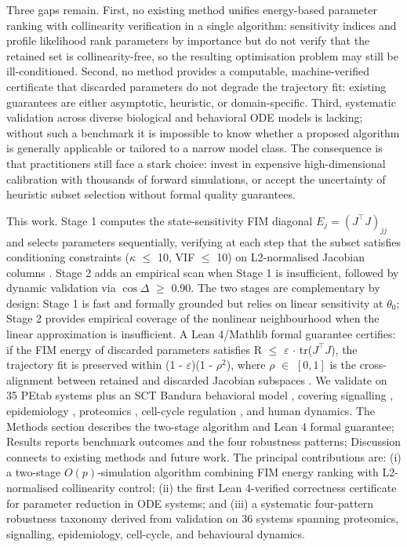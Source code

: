 \documentclass[pdflatex,sn-nature]{sn-jnl}
\begin{document}
Three gaps remain. First, no existing method unifies energy-based parameter ranking with collinearity verification in a single algorithm: sensitivity indices \cite{bib26} and profile likelihood \cite{bib24} rank parameters by importance but do not verify that the retained set is collinearity-free, so the resulting optimisation problem may still be ill-conditioned. Second, no method provides a computable, machine-verified certificate that discarded parameters do not degrade the trajectory fit: existing guarantees are either asymptotic, heuristic, or domain-specific. Third, systematic validation across diverse biological and behavioral ODE models is lacking; without such a benchmark it is impossible to know whether a proposed algorithm is generally applicable or tailored to a narrow model class. The consequence is that practitioners still face a stark choice: invest in expensive high-dimensional calibration with thousands of forward simulations, or accept the uncertainty of heuristic subset selection without formal quality guarantees.


This work. Stage 1 computes the state-sensitivity FIM diagonal $E_j=(J^\top J)_{jj}$ and selects parameters sequentially, verifying at each step that the subset satisfies conditioning constraints ($\kappa$ $\le$ 10, VIF $\le$ 10) on L2-normalised Jacobian columns \cite{bib5,bib9}. Stage 2 adds an empirical scan when Stage 1 is insufficient, followed by dynamic validation via $\cos\Delta$ $\ge$ 0.90. The two stages are complementary by design: Stage 1 is fast and formally grounded but relies on linear sensitivity at $\theta_0$; Stage 2 provides empirical coverage of the nonlinear neighbourhood when the linear approximation is insufficient. A Lean 4/Mathlib formal guarantee certifies: if the FIM energy of discarded parameters satisfies R $\le$ $\varepsilon$ $\cdot$ tr($J^\top J$), the trajectory fit is preserved within (1 - $\varepsilon$)(1 - $\rho^2$), where $\rho$ $\in$ $[0,1]$ is the cross-alignment between retained and discarded Jacobian subspaces \cite{bib19,bib21}. We validate on 35 PEtab systems \cite{bib27} plus an SCT Bandura behavioral model \cite{bib3}, covering signalling \cite{bib6}, epidemiology \cite{bib14}, proteomics \cite{bib12}, cell-cycle regulation \cite{bib18}, and human dynamics. The Methods section describes the two-stage algorithm and Lean 4 formal guarantee; Results reports benchmark outcomes and the four robustness patterns; Discussion connects to existing methods and future work. The principal contributions are: (i) a two-stage $O(p)$-simulation algorithm combining FIM energy ranking with L2-normalised collinearity control; (ii) the first Lean 4-verified correctness certificate for parameter reduction in ODE systems; and (iii) a systematic four-pattern robustness taxonomy derived from validation on 36 systems spanning proteomics, signalling, epidemiology, cell-cycle, and behavioural dynamics.
\end{document}
